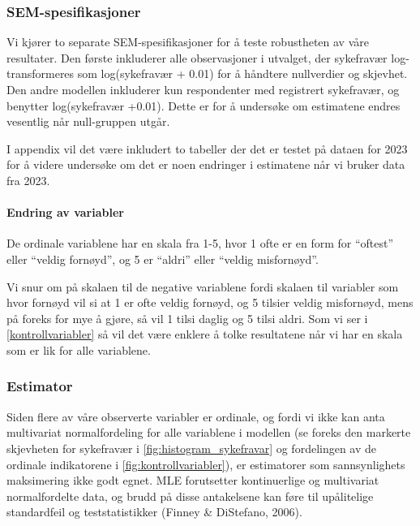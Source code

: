 \documentclass[
  12pt,
  a4paper,
  DIV=11,
  numbers=noendperiod]{scrartcl}
\let\oldparagraph\paragraph
\renewcommand{\paragraph}[1]{\oldparagraph{#1}\mbox{}}
\begin{document}
\subsubsection{SEM-spesifikasjoner}\label{sem-spesifikasjoner}

Vi kjører to separate SEM-spesifikasjoner for å teste robustheten av
våre resultater. Den første inkluderer alle observasjoner i utvalget,
der sykefravær log-transformeres som log(sykefravær + 0.01) for å
håndtere nullverdier og skjevhet. Den andre modellen inkluderer kun
respondenter med registrert sykefravær, og benytter log(sykefravær
+0.01). Dette er for å undersøke om estimatene endres vesentlig når
null-gruppen utgår.

I appendix vil det være inkludert to tabeller der det er testet på
dataen for 2023 for å videre undersøke om det er noen endringer i
estimatene når vi bruker data fra 2023.

\paragraph{Endring av variabler}\label{endring-av-variabler}

De ordinale variablene har en skala fra 1-5, hvor 1 ofte er en form for
``oftest'' eller ``veldig fornøyd'', og 5 er ``aldri'' eller ``veldig
misfornøyd''.

Vi snur om på skalaen til de negative variablene fordi skalaen til
variabler som hvor fornøyd vil si at 1 er ofte veldig fornøyd, og 5
tilsier veldig misfornøyd, mens på foreks for mye å gjøre, så vil 1
tilsi daglig og 5 tilsi aldri. Som vi ser i \autoref{kontrollvariabler}
så vil det være enklere å tolke resultatene når vi har en skala som er
lik for alle variablene.

\subsubsection{Estimator}\label{estimator}

Siden flere av våre observerte variabler er ordinale, og fordi vi ikke
kan anta multivariat normalfordeling for alle variablene i modellen (se
foreks den markerte skjevheten for sykefravær i
\autoref{fig:histogram_sykefravar} og fordelingen av de ordinale
indikatorene i \autoref{fig:kontrollvariabler}), er estimatorer som
sannsynlighets maksimering ikke godt egnet. MLE forutsetter
kontinuerlige og multivariat normalfordelte data, og brudd på disse
antakelsene kan føre til upålitelige standardfeil og teststatistikker
(Finney \& DiStefano, 2006).
\end{document}
